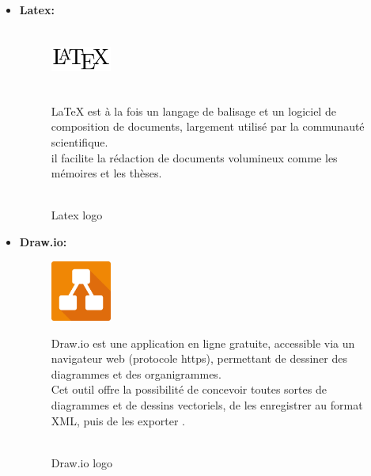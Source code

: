\begin{itemize}
\begin{figure}[!htb]
\begin{minipage}{0.60\textwidth}
                    \end{minipage}
            \end{figure}
            \item\textbf{Latex:}
             \begin{figure}[!htb]\centering
                \begin{minipage}{0.30\textwidth}
                \centering
                    {\includegraphics[width = 2cm , height=2cm]{img/techno/latex.png}}
                    \caption{\\ Latex logo \cite{latex}}\label{Fig:Data1}
                \end{minipage}
                \begin{minipage}{0.60\textwidth}
                    \par LaTeX est à la fois un langage de balisage et un logiciel de composition de documents,
                     largement utilisé par la communauté scientifique.\\
                      il facilite la rédaction de documents volumineux comme les mémoires et les thèses\cite{latex}.
                \end{minipage}
            \end{figure}
            \item\textbf{Draw.io:}
             \begin{figure}[!htb]\centering
                \begin{minipage}{0.30\textwidth}
                \centering
                    {\includegraphics[width = 2cm , height=2cm]{img/techno/draw.png}}
                    \caption{\\ Draw.io logo \cite{draw}}\label{Fig:Data1}
                \end{minipage}
                \begin{minipage}{0.60\textwidth}
                    \par Draw.io est une application en ligne gratuite, accessible via un navigateur web (protocole https), permettant de dessiner des diagrammes et des organigrammes. \\
                    Cet outil offre la possibilité de concevoir toutes sortes de diagrammes et de dessins vectoriels, de les enregistrer au format XML, puis de les exporter \cite{draw}.
                    \end{minipage}
            \end{figure}
            \end{itemize}
